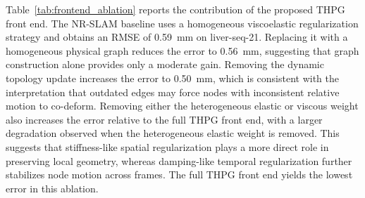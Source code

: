 \documentclass[pdflatex,sn-mathphys-num]{sn-jnl}
\begin{document}
Table~\ref{tab:frontend_ablation} reports the contribution of the proposed THPG front end. The NR-SLAM baseline uses a homogeneous viscoelastic regularization strategy and obtains an RMSE of 0.59~mm on liver-seq-21. Replacing it with a homogeneous physical graph reduces the error to 0.56~mm, suggesting that graph construction alone provides only a moderate gain. Removing the dynamic topology update increases the error to 0.50~mm, which is consistent with the interpretation that outdated edges may force nodes with inconsistent relative motion to co-deform. Removing either the heterogeneous elastic or viscous weight also increases the error relative to the full THPG front end, with a larger degradation observed when the heterogeneous elastic weight is removed. This suggests that stiffness-like spatial regularization plays a more direct role in preserving local geometry, whereas damping-like temporal regularization further stabilizes node motion across frames. The full THPG front end yields the lowest error in this ablation.

\begin{table}[t]
\caption{Fine-grained back-end prior-propagation ablation on representative dense depth completion sequences. The variants progressively add the front-end priors propagated to the diffusion-based depth completion stage.}
\label{tab:backend_prior_ablation}
\centering
\small
\setlength{\tabcolsep}{4pt}
\renewcommand{\arraystretch}{1.12}
\end{table}
\end{document}
